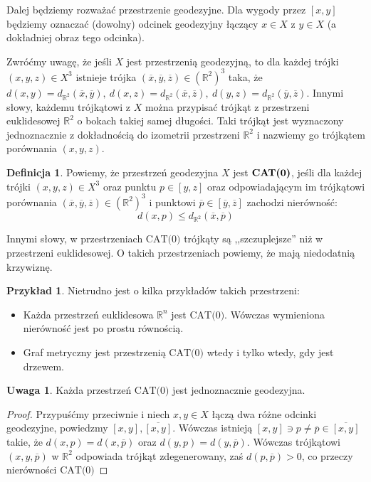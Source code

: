 \documentclass[licencjacka]{pracamgr}
\theoremstyle{definition}
\newtheorem{definition}{Definicja}[section]
\theoremstyle{definition}
\newtheorem{remark}{Uwaga}[section]
\theoremstyle{definition}
\theoremstyle{definition}
\newtheorem{example}{Przykład}[section]
\theoremstyle{definition}
\theoremstyle{plain}
\theoremstyle{plain}
\begin{document}
Dalej będziemy rozważać przestrzenie geodezyjne. Dla wygody przez $ [x,y] $ będziemy 
oznaczać (dowolny) odcinek geodezyjny łączący $ x \in X$ z $ y \in X $ (a dokładniej 
obraz tego odcinka).

Zwróćmy uwagę, że jeśli $ X $ jest przestrzenią geodezyjną, to dla każdej trójki 
$ (x,y,z) \in X^3 $ istnieje trójka $ (\overline{x},\overline{y}, \overline{z}) 
\in \left(\mathbb{R}^2\right)^3$ taka, że $ d(x,y) = d_{\mathbb{R}^2} (\overline{x}, 
\overline{y}), ~ d(x,z) = d_{\mathbb{R}^2} (\overline{x}, \overline{z}), 
~ d(y,z) = d_{\mathbb{R}^2} (\overline{y}, \overline{z})  $. Innymi słowy, każdemu 
trójkątowi z $ X $ można przypisać trójkąt z przestrzeni euklidesowej $ \mathbb{R}^2 $ o 
bokach takiej samej długości. Taki trójkąt jest wyznaczony jednoznacznie z dokładnością 
do izometrii przestrzeni $ \mathbb{R}^2 $ i nazwiemy go trójkątem porównania $ (x,y,z) $.

\begin{definition}
	Powiemy, że przestrzeń geodezyjna $ X $ jest $ \text{\textbf{CAT(0)}} $, jeśli 
	dla każdej trójki $ (x,y,z) \in X^3 $ oraz punktu $ p \in [y,z] $ oraz odpowiadającym 
	im trójkątowi porównania $ (\overline{x}, \overline{y}, \overline{z}) \in 
	\left(\mathbb{R}^2\right)^3 $ i punktowi $ \overline{p} \in [\overline{y}, 
	\overline{z}] $ zachodzi nierówność:
	$$ d(x,p) \leq d_{\mathbb{R}^2}(\overline{x}, \overline{p}) $$
\end{definition} 

Innymi słowy, w przestrzeniach $ \text{CAT(0)} $ trójkąty są ,,szczuplejsze'' niż w 
przestrzeni euklidesowej. O takich przestrzeniach powiemy, że mają niedodatnią 
krzywiznę.


\begin{example} Nietrudno jest o kilka przykładów takich przestrzeni:
	\begin{itemize}
	\item Każda przestrzeń euklidesowa $ \mathbb{R}^n $ jest $ \text{CAT(0)} $. Wówczas 
	wymieniona nierówność jest po prostu równością.
	\item Graf metryczny jest przestrzenią $ \text{CAT(0)} $ wtedy i tylko wtedy, gdy 
	jest drzewem.
	\end{itemize}
\end{example}

\begin{remark}
	Każda przestrzeń $ \text{CAT(0)} $ jest jednoznacznie geodezyjna.
\end{remark}
\begin{proof}
	Przypuśćmy przeciwnie i niech $ x,y \in X $ łączą dwa różne odcinki geodezyjne, 
	powiedzmy $ [x,y], \overline{[x,y]} $.	Wówczas istnieją $ [x,y] \ni p \neq \overline p 
	\in	\overline{[x,y]}  $ takie, że $ d(x,p) = d(x,\overline{p}) $ oraz $ d(y,p) = 
	d(y, \overline{p}) $. Wówczas trójkątowi $ (x,y,\overline{p}) $ w $ \mathbb{R}^2$ 
	odpowiada trójkąt zdegenerowany, zaś $ d(p,\overline{p}) > 0 $, co przeczy nierówności 
	$ \text{CAT(0)} $
\end{proof}
\end{document}
